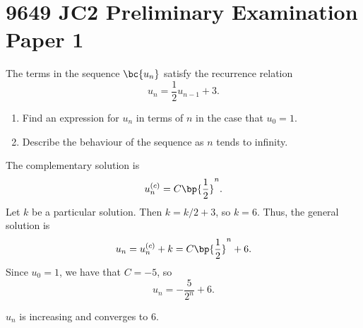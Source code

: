 \section{9649 JC2 Preliminary Examination Paper 1}

\begin{problem}
    The terms in the sequence $\bc{u_n}$ satisfy the recurrence relation \[u_n = \frac12 u_{n-1} + 3.\]

    \begin{enumerate}
        \item Find an expression for $u_n$ in terms of $n$ in the case that $u_0 = 1$.
        \item Describe the behaviour of the sequence as $n$ tends to infinity.
    \end{enumerate}
\end{problem}
\begin{solution}
    \begin{ppart}
        The complementary solution is \[u_n^{(c)} = C \bp{\frac12}^n.\] Let $k$ be a particular solution. Then $k = k/2 + 3$, so $k = 6$. Thus, the general solution is \[u_n = u_{n}^{(c)} + k = C \bp{\frac12}^n + 6.\] Since $u_0 = 1$, we have that $C = -5$, so \[u_n = -\frac{5}{2^n} + 6.\]
    \end{ppart}
    \begin{ppart}
        $u_n$ is increasing and converges to 6.
    \end{ppart}
\end{solution}

